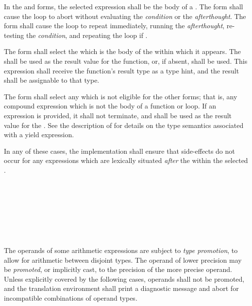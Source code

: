 \specsubsubitem
In the  and  forms, the selected expression
shall be the body of a . The  form shall
cause the loop to abort without evaluating the \textit{condition} or the
\textit{afterthought}. The  form shall cause the loop to
repeat immediately, running the \textit{afterthought}, re-testing the
\textit{condition}, and repeating the loop if .

\specsubsubitem
The  form shall select the 
which is the body of the  within which it
appears. The  shall be used as the result value for the
function, or, if absent,  shall be used. This expression shall
receive the function's result type as a type hint, and the result shall be
assignable to that type.

\specsubsubitem
The  form shall select any
 which is not eligible for the other forms;
that is, any compound expression which is not the body of a function or loop. If
an expression is provided, it shall not terminate, and shall be used as the
result value for the . See the description of
 for details on the type semantics associated
with a yield expression.

\specsubsubitem
In any of these cases, the implementation shall ensure that side-effects do not
occur for any expressions which are lexically situated \textit{after} the
 within the selected
.


\begin{grammar}
 \\
	 \\
	 \\
	 \\
	 \\
	 \\
\end{grammar}


\specsubitem
The operands of some arithmetic expressions are subject to \textit{type
promotion}, to allow for arithmetic between disjoint types. The operand of
lower precision may be \textit{promoted}, or implicitly cast, to the precision
of the more precise operand. Unless explicitly covered by the following cases,
operands shall not be promoted, and the translation environment shall print a
diagnostic message and abort for incompatible combinations of operand types.

